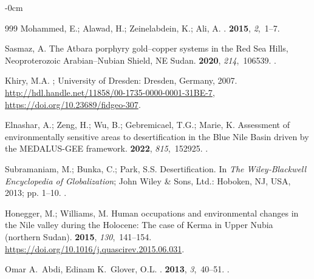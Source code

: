 \documentclass[jimaging,article,accept,pdftex,moreauthors]{Definitions/mdpi}
\begin{document}
\begin{adjustwidth}{-\extralength}{0cm}
\begin{thebibliography}{999}
Mohammed, E.; Alawad, H.; Zeinelabdein, K.; Ali, A.
.
 {\bf 2015}, {\em 2},~1--7.

Sasmaz, A.
\newblock The Atbara porphyry gold–copper systems in the Red Sea Hills,
  Neoproterozoic Arabian–Nubian Shield, NE Sudan.
 {\bf 2020}, {\em
  214},~106539.
.

Khiry, M.A.
;
  University of Dresden: Dresden, Germany, 2007.
\newblock \url {http://hdl.handle.net/11858/00-1735-0000-0001-31BE-7},
  {\url{https://doi.org/10.23689/fidgeo-307}}.

Elnashar, A.; Zeng, H.; Wu, B.; Gebremicael, T.G.; Marie, K.
\newblock Assessment of environmentally sensitive areas to desertification in
  the Blue Nile Basin driven by the MEDALUS-GEE framework.
 {\bf 2022}, {\em 815},~152925.
.

Subramaniam, M.; Bunka, C.; Park, S.S. Desertification.
\newblock In {\em The Wiley‐Blackwell Encyclopedia of Globalization}; John
  Wiley \& Sons, Ltd.: Hoboken, NJ, USA, %
  2013; pp. 1--10.
.

Honegger, M.; Williams, M.
\newblock Human occupations and environmental changes in the Nile valley during
  the Holocene: The case of Kerma in Upper Nubia (northern Sudan).
 {\bf 2015}, {\em 130},~141--154.
  {\url{https://doi.org/10.1016/j.quascirev.2015.06.031}}.

Omar A.~Abdi, Edinam K.~Glover, O.L.
.
 {\bf 2013},
  {\em 3},~40--51.
.


\end{thebibliography}
\end{adjustwidth}
\end{document}
